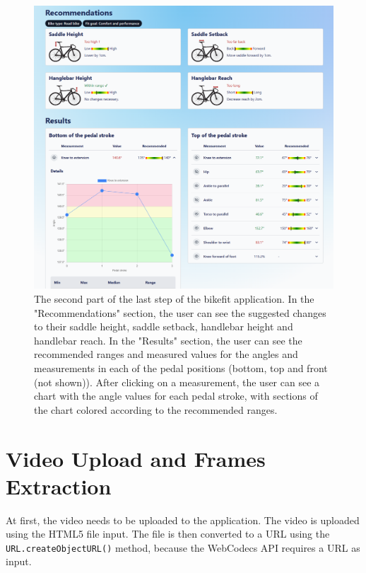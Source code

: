 \begin{figure}[htbp]
    \centering
    \includegraphics[width=\textwidth]{obrazky-figures/step3-bot-crop.png}
    \caption{The second part of the last step of the bikefit application. In the "Recommendations" section, the user can see the suggested changes to their saddle height, saddle setback, handlebar height and handlebar reach. In the "Results" section, the user can see the recommended ranges and measured values for the angles and measurements in each of the pedal positions (bottom, top and front (not shown)). After clicking on a measurement, the user can see a chart with the angle values for each pedal stroke, with sections of the chart colored according to the recommended ranges.}
    \label{fig:step3-bottom}
\end{figure}





\section{Video Upload and Frames Extraction}
\label{video_upload_and_processing}
At first, the video needs to be uploaded to the application. The video is uploaded using the HTML5 file input. The file is then converted to a URL using the \texttt{URL.createObjectURL()} method, because the WebCodecs API requires a URL as input.

